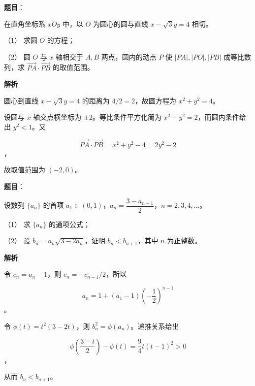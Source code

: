 \begin{answer}

\textbf{题目}：

在直角坐标系 $xOy$ 中，以 $O$ 为圆心的圆与直线 $x-\sqrt3y=4$ 相切。

（1） 求圆 $O$ 的方程；

（2） 圆 $O$ 与 $x$ 轴相交于 $A,B$ 两点，圆内的动点 $P$ 使 $|PA|,|PO|,|PB|$ 成等比数列，求 $\overrightarrow{PA}\cdot\overrightarrow{PB}$ 的取值范围。

\textbf{解析}


圆心到直线 $x-\sqrt3y=4$ 的距离为 $4/2=2$，故圆方程为 $x^2+y^2=4$。


设圆与 $x$ 轴交点横坐标为 $\pm2$。等比条件平方化简为 $x^2-y^2=2$，而圆内条件给出 $y^2<1$。又

\nopagebreak[4]
\[
\overrightarrow{PA}\cdot\overrightarrow{PB}=x^2+y^2-4=2y^2-2
\]
，

故取值范围为 $(-2,0)$。



\end{answer}
\begin{answer}

\textbf{题目}：

设数列 $\{a_n\}$ 的首项 $a_1\in(0,1)$，$a_n=\dfrac{3-a_{n-1}}2$，$n=2,3,4,\ldots$。

（1） 求 $\{a_n\}$ 的通项公式；

（2） 设 $b_n=a_n\sqrt{3-2a_n}$，证明 $b_n<b_{n+1}$，其中 $n$ 为正整数。

\textbf{解析}


令 $c_n=a_n-1$，则 $c_n=-c_{n-1}/2$，所以

\nopagebreak[4]
\[
a_n=1+(a_1-1)\left(-\frac12\right)^{n-1}
\]
。


令 $\phi(t)=t^2(3-2t)$，则 $b_n^2=\phi(a_n)$。递推关系给出

\nopagebreak[4]
\[
\phi\left(\frac{3-t}{2}\right)-\phi(t)
=\frac94t(t-1)^2>0
\]
，

从而 $b_n<b_{n+1}$。



\end{answer}
